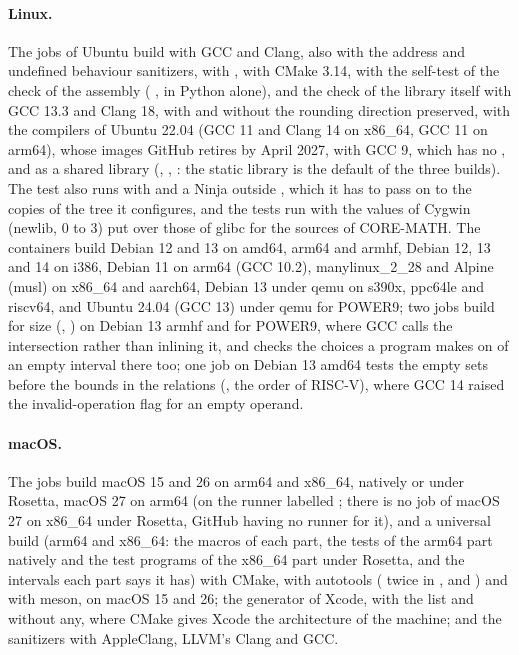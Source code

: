 \paragraph{Linux.} The jobs of Ubuntu build with GCC and Clang, also with
the address and undefined behaviour sanitizers, with
, with CMake 3.14, with the self-test of the
check of the assembly (
, in Python alone), and the check of the library itself
with GCC 13.3 and Clang 18, with and without the rounding direction
preserved,\newinvfive{} with the compilers of Ubuntu
22.04 (GCC 11 and Clang 14 on x86\_64, GCC 11 on arm64), whose images GitHub
retires by April 2027, with GCC 9, which has no
, and as a shared library
(, ,
: the static library is the default of the
three builds).\newinvfive{} The test  also
runs with  and a Ninja outside , which it has
to pass on to the copies of the tree it configures, and the tests run with
the  values of Cygwin (newlib, 0 to 3) put over those of glibc
for the sources of CORE-MATH. The containers build Debian 12 and 13 on
amd64, arm64 and armhf, Debian 12, 13 and 14 on i386, Debian 11 on arm64
(GCC 10.2), manylinux\_2\_28 and Alpine
(musl) on x86\_64 and aarch64, Debian 13 under qemu on s390x, ppc64le and
riscv64, and Ubuntu 24.04 (GCC 13) under qemu for POWER9; two jobs build for
size (, ) on Debian 13 armhf and for POWER9,
where GCC calls the intersection rather than inlining it, and
 checks the choices a program makes on
 of an empty interval there too; one job on Debian 13
amd64 tests the empty sets before the bounds in the relations
(, the order of RISC-V), where GCC
14 raised the invalid-operation flag for an empty operand.

\paragraph{macOS.} The jobs build macOS 15 and 26 on arm64 and x86\_64,
natively or under Rosetta, macOS 27 on arm64 (on the runner labelled
; there is no job of macOS 27 on x86\_64 under Rosetta, GitHub
having no runner for it), and a universal build (arm64 and x86\_64: the
macros of each part, the tests of the arm64 part natively and the test
programs of the x86\_64 part under Rosetta, and the intervals each part says
it has)\newinvfive{} with CMake, with autotools ( twice in
,  and ) and with meson, on macOS 15
and 26; the generator of Xcode, with the list  and
without any, where CMake gives Xcode the architecture of the machine; and
the sanitizers with AppleClang, LLVM's Clang and GCC.

